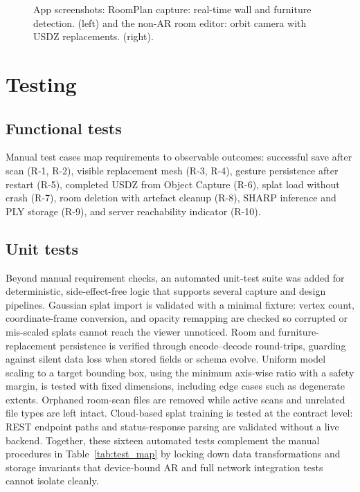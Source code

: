 \begin{figure}[H]
\centering
\begin{minipage}[t]{0.47\textwidth}
  \centering
  \label{fig:ui_scan}
\end{minipage}
\hfill
\begin{minipage}[t]{0.47\textwidth}
  \centering
  \label{fig:ui_editor}
\end{minipage}
\caption{App screenshots: RoomPlan capture: real-time wall and furniture detection. (left) and the non-AR room editor: orbit camera with USDZ replacements. (right).}
\label{fig:ui_scan_editor}
\end{figure}

\section{Testing}

\subsection{Functional tests}

Manual test cases map requirements to observable outcomes: successful save after scan (R-1, R-2), visible replacement mesh (R-3, R-4), gesture persistence after restart (R-5), completed USDZ from Object Capture (R-6), splat load without crash (R-7), room deletion with artefact cleanup (R-8), SHARP inference and PLY storage (R-9), and server reachability indicator (R-10).

\subsection{Unit tests}
Beyond manual requirement checks, an automated unit-test suite was added for deterministic, side-effect-free logic that supports several capture and design pipelines. Gaussian splat import is validated with a minimal fixture: vertex count, coordinate-frame conversion, and opacity remapping are checked so corrupted or mis-scaled splats cannot reach the viewer unnoticed. Room and furniture-replacement persistence is verified through encode–decode round-trips, guarding against silent data loss when stored fields or schema evolve. Uniform model scaling to a target bounding box, using the minimum axis-wise ratio with a safety margin, is tested with fixed dimensions, including edge cases such as degenerate extents. Orphaned room-scan files are removed while active scans and unrelated file types are left intact. Cloud-based splat training is tested at the contract level: REST endpoint paths and status-response parsing are validated without a live backend. Together, these sixteen automated tests complement the manual procedures in Table~\ref{tab:test_map} by locking down data transformations and storage invariants that device-bound AR and full network integration tests cannot isolate cleanly.

